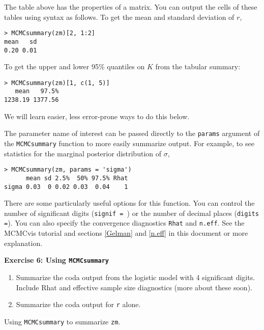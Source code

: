 \documentclass[12pt,english]{article}
\begin{document}
\noindent The table above has the properties of a matrix. You can output the cells of these tables using syntax as follows. To get the mean and standard deviation of $r$,

\begin{Verbatim}
> MCMCsummary(zm)[2, 1:2]
mean   sd 
0.20 0.01 
\end{Verbatim}

\noindent To get the upper and lower 95\% quantiles on $K$ from the tabular summary: 

\begin{Verbatim}
> MCMCsummary(zm)[1, c(1, 5)]
   mean   97.5% 
1238.19 1377.56
\end{Verbatim}
We will learn easier, less error-prone ways to do this below.

\noindent  The parameter name of interest can be passed directly to the \texttt{params} argument of the \texttt{MCMCsummary} function to more easily summarize output. For example, to see statistics for the marginal posterior distribution of $\sigma$,

\begin{Verbatim}
> MCMCsummary(zm, params = 'sigma')
      mean sd 2.5%  50% 97.5% Rhat
sigma 0.03  0 0.02 0.03  0.04    1
\end{Verbatim}

There are some particularly useful options for this function.  You can control the number of significant digits (\texttt{signif = }) or the number of decimal places (\texttt{digits =}).  You can also specify the convergence diagnostics \texttt{Rhat} and \texttt{n.eff}.  See the MCMCvis tutorial and sections \ref{Gelman} and \ref{n.eff}  in this document or more explanation.

\bigskip
\belowcaptionskip=-20pt
\begin{exercise}
\begin{mdframed}
\doublespacing
\textbf{Exercise 6: Using \texttt{MCMCsummary}} 
\begin{enumerate}
\item Summarize the coda output from the logistic model with 4 significant digits.  Include Rhat and effective sample size diagnostics (more about these soon). 
\item Summarize the coda output for  \texttt{r} alone.  
\end{enumerate}
\end{mdframed}
\captionsetup{textformat=empty, labelformat=empty}
\caption[Using \texttt{MCMCsummary} to summarize \texttt{zm}]{Using \texttt{MCMCsummary} to summarize \texttt{zm}.}
\label{ex:MCMCsummary}
\end{exercise}
\belowcaptionskip=0pt
\end{document}
